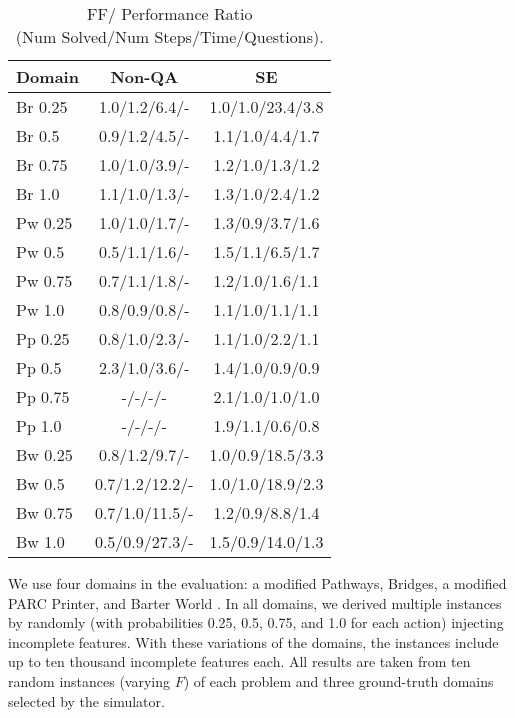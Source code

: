 \documentclass{article}
\begin{document}
\begin{table}[t]\small\centering\begin{tabular}{|l|cc|}\hline
Domain & Non-QA  & SE \\ \hline
Br	0.25	 & 1.0/1.2/6.4/-	 & 1.0/1.0/23.4/3.8 	\\ \hline
Br	0.5	 & 0.9/1.2/4.5/-	 & 1.1/1.0/4.4/1.7 	\\ \hline
Br	0.75	 & 1.0/1.0/3.9/-	 & 1.2/1.0/1.3/1.2 	\\ \hline
Br	1.0	 & 1.1/1.0/1.3/-	 & 1.3/1.0/2.4/1.2 	\\ \hline
\hline
Pw	0.25	 & 1.0/1.0/1.7/-	 & 1.3/0.9/3.7/1.6 	\\ \hline
Pw	0.5	 & 0.5/1.1/1.6/-	 & 1.5/1.1/6.5/1.7 	\\ \hline
Pw	0.75	 & 0.7/1.1/1.8/-	 & 1.2/1.0/1.6/1.1 	\\ \hline
Pw	1.0	 & 0.8/0.9/0.8/-	 & 1.1/1.0/1.1/1.1 	\\ \hline
\hline
Pp	0.25	 & 0.8/1.0/2.3/-	 & 1.1/1.0/2.2/1.1 	\\ \hline
Pp	0.5	 & 2.3/1.0/3.6/-	 & 1.4/1.0/0.9/0.9 	\\ \hline
Pp	0.75	 & -/-/-/- 	 & 2.1/1.0/1.0/1.0 	\\ \hline
Pp	1.0	 & -/-/-/- 	 & 1.9/1.1/0.6/0.8 	\\ \hline
\hline
Bw	0.25	 & 0.8/1.2/9.7/- 	 & 1.0/0.9/18.5/3.3 	\\ \hline
Bw	0.5	 & 0.7/1.2/12.2/-	 & 1.0/1.0/18.9/2.3 	\\ \hline
Bw	0.75	 & 0.7/1.0/11.5/-	 & 1.2/0.9/8.8/1.4 	\\ \hline
Bw	1.0	 & 0.5/0.9/27.3/-	 & 1.5/0.9/14.0/1.3 	\\ \hline
\end{tabular}\caption{\label{tab:plannerComp} FF/
 Performance Ratio \\(Num Solved/Num Steps/Time/Questions).}\end{table}


 We use four domains in the evaluation: a modified Pathways,
Bridges,  a modified PARC Printer, and Barter World \citep{bryce-icaps11}.  In
all domains, we derived multiple instances by randomly (with probabilities 0.25,
0.5, 0.75, and 1.0 for each action) injecting incomplete  features.   
With these variations of the domains, the instances include up to ten thousand
incomplete  features each. All results are taken from ten random instances
(varying $F$) of each problem and three ground-truth domains selected by the
simulator.
\end{document}

